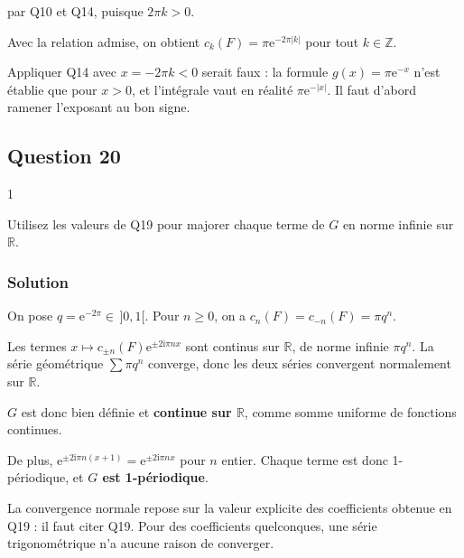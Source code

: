 \documentclass[11pt,a4paper]{article}
\newcommand{\equationajustee}[1]{%
  \sbox{\boiteequation}{$\displaystyle #1$}%
  \ifdim\wd\boiteequation>\linewidth
    \[\resizebox{\linewidth}{!}{\usebox{\boiteequation}}\]%
  \else
    \[#1\]%
  \fi}
\begin{document}
par Q10 et Q14, puisque \(2\pi k>0\).

\equationajustee{\boxed{c_0(F)=\pi,\ \text{ et }\ \forall k\in{\mathbb{N}}^*,\ c_k(F)=\pi{\mathrm{e}}^{-2\pi k}}}

Avec la relation admise, on obtient \(c_k(F)=\pi{\mathrm{e}}^{-2\pi|k|}\) pour tout \(k\in\mathbb{Z}\).

\begin{piege}

Appliquer Q14 avec \(x=-2\pi k<0\) serait faux : la formule \(g(x)=\pi{\mathrm{e}}^{-x}\) n'est établie que pour \(x>0\), et l'intégrale vaut en réalité \(\pi{\mathrm{e}}^{-|x|}\). Il faut d'abord ramener l'exposant au bon signe.

\end{piege}

\hypertarget{question-20}{%
\subsection{Question 20}\label{question-20}}

\begin{indication}{1}

Utilisez les valeurs de Q19 pour majorer chaque terme de \(G\) en norme infinie sur \(\mathbb{R}\).

\end{indication}

\hypertarget{solution-19}{%
\subsubsection{Solution}\label{solution-19}}

On pose \(q={\mathrm{e}}^{-2\pi}\in\,]0,1[\). Pour \(n\ge0\), on a \(c_n(F)=c_{-n}(F)=\pi q^n\).

Les termes \(x\mapsto c_{\pm n}(F){\mathrm{e}}^{\pm2\mathrm{i}\pi nx}\) sont continus sur \(\mathbb{R}\), de norme infinie \(\pi q^n\). La série géométrique \(\sum\pi q^n\) converge, donc les deux séries convergent normalement sur \(\mathbb{R}\).

\(G\) est donc bien définie et \textbf{continue sur \(\mathbb{R}\)}, comme somme uniforme de fonctions continues.

De plus, \({\mathrm{e}}^{\pm2\mathrm{i}\pi n(x+1)}={\mathrm{e}}^{\pm2\mathrm{i}\pi nx}\) pour \(n\) entier. Chaque terme est donc 1-périodique, et \textbf{\(G\) est 1-périodique}.

\begin{methode}

La convergence normale repose sur la valeur explicite des coefficients obtenue en Q19 : il faut citer Q19. Pour des coefficients quelconques, une série trigonométrique n'a aucune raison de converger.

\end{methode}
\end{document}
